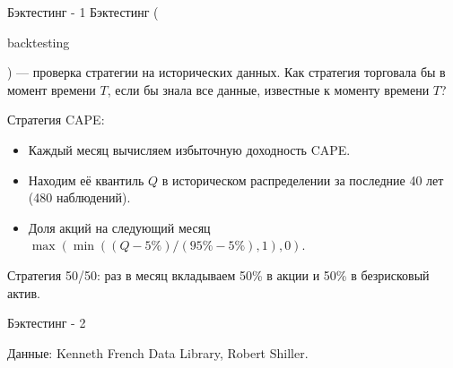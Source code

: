 \documentclass{beamer}
\newcommand{\en}[1]{\begin{otherlanguage}{english}#1\end{otherlanguage}}
\begin{document}
\begin{frame}{Бэктестинг - 1}
\justify
Бэктестинг (\en{backtesting}) --- проверка стратегии на исторических данных. 
Как стратегия торговала бы в момент времени $T$, если бы знала все 
данные, известные к моменту времени $T$?

\justify
Стратегия CAPE:
\begin{itemize}
\item Каждый месяц вычисляем избыточную доходность CAPE.
\item Находим её квантиль $Q$ в историческом распределении за последние 40 лет
(480 наблюдений).
\item Доля акций на следующий месяц $\max(\min((Q - 5\%) / (95\%-5\%), 1), 0)$.
\end{itemize}

\justify
Стратегия 50/50: раз в месяц вкладываем 50\% в акции и 50\% в безрисковый 
актив.
\end{frame}



\newcommand{\plotThickOneAxis}{
   \plotThickAxis{1.0}   
}

\renewcommand{\addGrowthPlot}[4]{
        \addplot[
            color = #2,
            line width = 1pt, 
            mark = #3,
            mark repeat = 120,
            mark phase = 276,
            mark options = {scale=2},
            style = #4
        ]
        table[
            x = date,
            y = #1,
            col sep = comma
        ]
        {data/cape_strategy_growth_1927.csv};
    }

\begin{frame}{Бэктестинг - 2}

\centering
{}
{\scriptsize Данные: Kenneth French Data Library, Robert Shiller.}
\end{frame}
\end{document}

